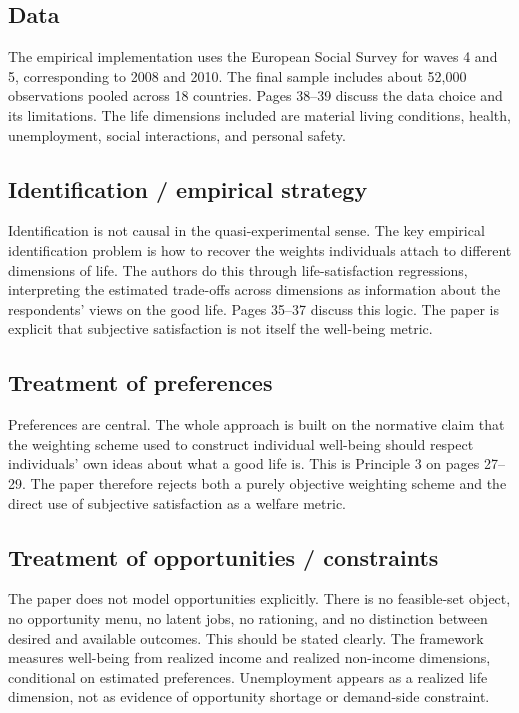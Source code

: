 \documentclass[11pt,a4paper]{article}
\begin{document}
\subsection*{Data}
The empirical implementation uses the European Social Survey for waves 4 and 5, corresponding to 2008 and 2010. The final sample includes about 52,000 observations pooled across 18 countries. Pages 38–39 discuss the data choice and its limitations. The life dimensions included are material living conditions, health, unemployment, social interactions, and personal safety.

\subsection*{Identification / empirical strategy}
Identification is not causal in the quasi-experimental sense. The key empirical identification problem is how to recover the weights individuals attach to different dimensions of life. The authors do this through life-satisfaction regressions, interpreting the estimated trade-offs across dimensions as information about the respondents’ views on the good life. Pages 35–37 discuss this logic. The paper is explicit that subjective satisfaction is not itself the well-being metric.

\subsection*{Treatment of preferences}
Preferences are central. The whole approach is built on the normative claim that the weighting scheme used to construct individual well-being should respect individuals’ own ideas about what a good life is. This is Principle 3 on pages 27–29. The paper therefore rejects both a purely objective weighting scheme and the direct use of subjective satisfaction as a welfare metric.

\subsection*{Treatment of opportunities / constraints}
The paper does not model opportunities explicitly. There is no feasible-set object, no opportunity menu, no latent jobs, no rationing, and no distinction between desired and available outcomes. This should be stated clearly. The framework measures well-being from realized income and realized non-income dimensions, conditional on estimated preferences. Unemployment appears as a realized life dimension, not as evidence of opportunity shortage or demand-side constraint.
\end{document}

